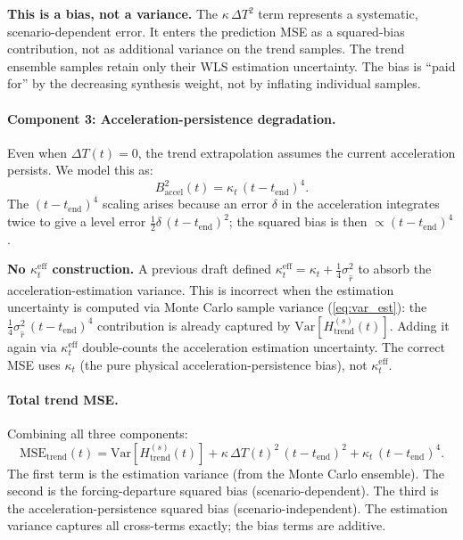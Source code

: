 \documentclass[11pt]{article}
\newcommand{\dT}{\Delta T}
\newcommand{\tend}{t_{\mathrm{end}}}
\newcommand{\sigrdot}{\sigma_{\dot{\hat{r}}}}
\newcommand{\MSEtrend}{\mathrm{MSE}_{\mathrm{trend}}}
\begin{document}
\textbf{This is a bias, not a variance.}  The $\kappa\,\dT^2$ term represents a systematic, scenario-dependent error.  It enters the prediction MSE as a squared-bias contribution, not as additional variance on the trend samples.  The trend ensemble samples retain only their WLS estimation uncertainty.  The bias is ``paid for'' by the decreasing synthesis weight, not by inflating individual samples.

\paragraph{Component 3: Acceleration-persistence degradation.}  Even when $\dT(t) = 0$, the trend extrapolation assumes the current acceleration persists.  We model this as:
\begin{equation}
  B_{\mathrm{accel}}^2(t) = \kappa_t\,(t - \tend)^4.
  \label{eq:bias_accel}
\end{equation}
The $(t - \tend)^4$ scaling arises because an error $\delta$ in the acceleration integrates twice to give a level error $\frac{1}{2}\delta\,(t - \tend)^2$; the squared bias is then $\propto (t - \tend)^4$.

\textbf{No $\kappa_t^{\mathrm{eff}}$ construction.}  A previous draft defined $\kappa_t^{\mathrm{eff}} = \kappa_t + \frac{1}{4}\sigrdot^2$ to absorb the acceleration-estimation variance.  This is incorrect when the estimation uncertainty is computed via Monte Carlo sample variance (\cref{eq:var_est}): the $\frac{1}{4}\sigrdot^2\,(t-\tend)^4$ contribution is already captured by $\mathrm{Var}[H_{\mathrm{trend}}^{(s)}(t)]$.  Adding it again via $\kappa_t^{\mathrm{eff}}$ double-counts the acceleration estimation uncertainty.  The correct MSE uses $\kappa_t$ (the pure physical acceleration-persistence bias), not $\kappa_t^{\mathrm{eff}}$.

\paragraph{Total trend MSE.}  Combining all three components:
\begin{equation}
  \MSEtrend(t) = \mathrm{Var}\!\left[H_{\mathrm{trend}}^{(s)}(t)\right] + \kappa\,\dT(t)^2\,(t - \tend)^2 + \kappa_t\,(t - \tend)^4.
  \label{eq:MSE_trend_total}
\end{equation}
The first term is the estimation variance (from the Monte Carlo ensemble).  The second is the forcing-departure squared bias (scenario-dependent).  The third is the acceleration-persistence squared bias (scenario-independent).  The estimation variance captures all cross-terms exactly; the bias terms are additive.
\end{document}
